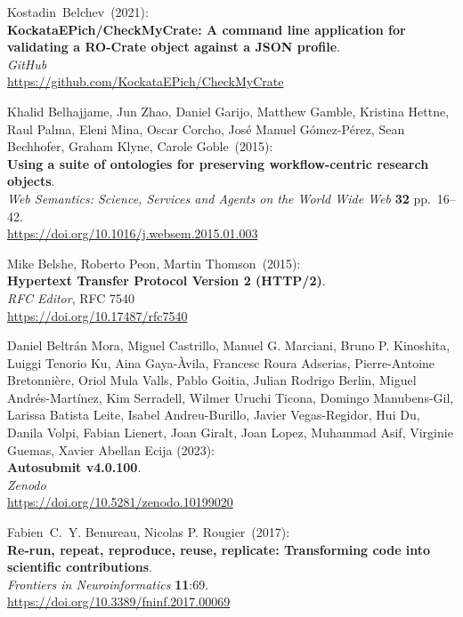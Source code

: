 \begin{thebibliography}{9}
Kostadin~Belchev~(2021): \\
\textbf{KockataEPich/CheckMyCrate: A command line application for validating a RO-Crate object against a JSON profile}.\\
\emph{GitHub}\\
\url{https://github.com/KockataEPich/CheckMyCrate}

Khalid Belhajjame, Jun Zhao, Daniel Garijo, Matthew Gamble, Kristina Hettne, Raul Palma, Eleni Mina, Oscar Corcho, José Manuel Gómez-Pérez, Sean Bechhofer, Graham Klyne, Carole Goble~(2015): \\
\textbf{Using a suite of ontologies for preserving workflow-centric research objects}.\\
\emph{Web Semantics: Science, Services and Agents on the World Wide Web}
\textbf{32} pp.~16--42.\\
\url{https://doi.org/10.1016/j.websem.2015.01.003}

Mike Belshe, Roberto Peon, Martin Thomson~(2015): \\
\textbf{Hypertext Transfer Protocol Version 2 (HTTP/2)}.\\
\emph{RFC Editor}, RFC 7540\\
\url{https://doi.org/10.17487/rfc7540}

Daniel Beltrán Mora, Miguel Castrillo, Manuel G. Marciani, Bruno P. Kinoshita, Luiggi Tenorio Ku, Aina Gaya-Àvila, Francesc Roura Adserias,  Pierre-Antoine Bretonnière, Oriol Mula Valls, Pablo Goitia, Julian Rodrigo Berlin,  Miguel Andrés-Martínez, Kim Serradell, Wilmer Uruchi Ticona,  Domingo Manubens-Gil, Larissa Batista Leite, Isabel Andreu-Burillo, Javier Vegas-Regidor, Hui Du, Danila Volpi, Fabian Lienert, Joan Giralt, Joan Lopez, Muhammad Asif, Virginie Guemas, Xavier Abellan Ecija (2023):\\
\textbf{Autosubmit v4.0.100}.\\
\emph{Zenodo} \\
\url{https://doi.org/10.5281/zenodo.10199020}

Fabien~C.~Y. Benureau, Nicolas P. Rougier~(2017): \\
\textbf{Re-run, repeat, reproduce, reuse, replicate: Transforming code into scientific contributions}.\\
\emph{Frontiers in Neuroinformatics} \textbf{11}:69.\\
\url{https://doi.org/10.3389/fninf.2017.00069}


\end{thebibliography}
